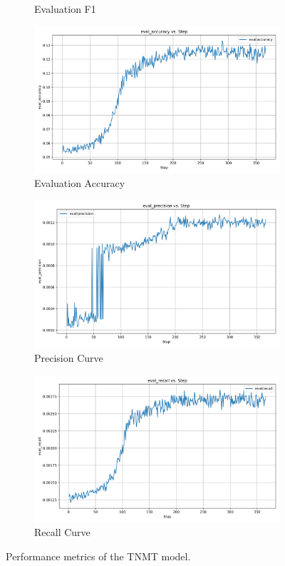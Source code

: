 \documentclass[12pt]{article}
\begin{document}
\begin{figure}[!ht]
\begin{subfigure}[b]{0.32\textwidth}
		\caption{Evaluation F1}
		\label{fig:eval_f1}
	\end{subfigure}
	\begin{subfigure}[b]{0.32\textwidth}
		\includegraphics[width=\linewidth]{eval_accuracy.png}
		\caption{Evaluation Accuracy}
		\label{fig:eval_accuracy}
	\end{subfigure}
	\hfill
	\begin{subfigure}[b]{0.32\textwidth}
		\includegraphics[width=\linewidth]{eval_precision.png}
		\caption{Precision Curve}
		\label{fig:eval_precision}
	\end{subfigure}
	\hfill
	\begin{subfigure}[b]{0.32\textwidth}
		\includegraphics[width=\linewidth]{eval_recall.png}
		\caption{Recall Curve}
		\label{fig:eval_recall}
	\end{subfigure}
	\caption{Performance metrics of the TNMT model.}
	\label{fig:tnmt_performance}
\end{figure}
\end{document}

